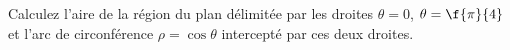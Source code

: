 
\begin{exercice}\label{exoIntMult0003}

Calculez l'aire de la région du plan délimitée par les droites $\theta = 0$, $\theta = \f{\pi}{4}$ et l'arc de circonférence $\rho = \cos\theta$ intercepté par ces deux droites.

\end{exercice}
